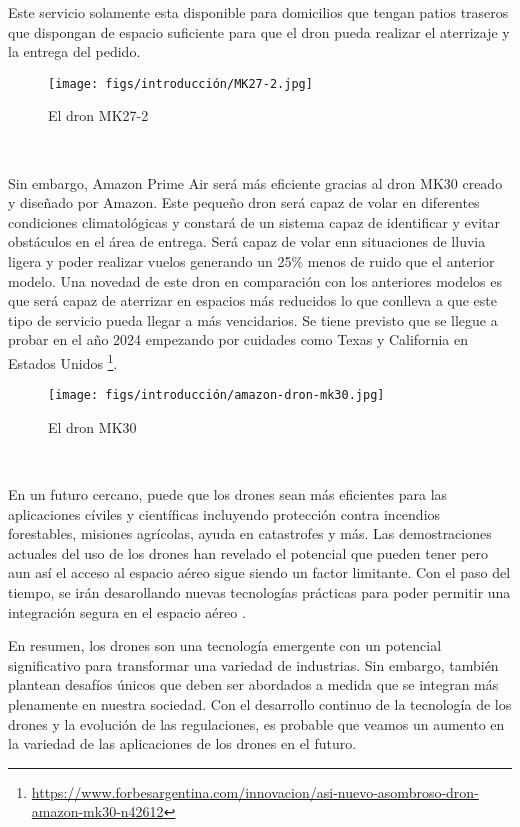 Este servicio solamente esta disponible para domicilios que tengan patios traseros que dispongan de espacio suficiente para que el dron pueda realizar el aterrizaje y la 
entrega del pedido.

\begin{figure} [H]
  \begin{center}
    \texttt{[image: figs/introducción/MK27-2.jpg]}
  \end{center}
  \caption{El dron MK27-2}
  \label{fig:MK27-2}
\end{figure}\

Sin embargo, Amazon Prime Air será más eficiente gracias al dron MK30 creado y diseñado por Amazon. Este pequeño dron será capaz de volar en diferentes condiciones climatológicas y 
constará de un sistema capaz de identificar y evitar obstáculos en el área de entrega. Será capaz de volar enn situaciones de lluvia ligera y poder realizar vuelos generando un 25\%
menos de ruido que el anterior modelo. Una novedad de este dron en comparación con los anteriores modelos es que será capaz de aterrizar en espacios más reducidos lo que conlleva a que
este tipo de servicio pueda llegar a más vencidarios. \newline
Se tiene previsto que se llegue a probar en el año 2024 empezando por cuidades como Texas y California en Estados Unidos
\footnote{\url{https://www.forbesargentina.com/innovacion/asi-nuevo-asombroso-dron-amazon-mk30-n42612}}. \newline


\begin{figure} [H]
  \begin{center}
    \texttt{[image: figs/introducción/amazon-dron-mk30.jpg]}
  \end{center}
  \caption{El dron MK30}
  \label{fig:MK30}
\end{figure}\

En un futuro cercano, puede que los drones sean más eficientes para las aplicaciones cíviles y científicas incluyendo protección contra incendios forestables, misiones agrícolas, 
ayuda en catastrofes y más. 
Las demostraciones actuales del uso de los drones han revelado el potencial que pueden tener pero aun así el acceso al espacio aéreo sigue siendo un factor limitante. Con el paso del 
tiempo, se irán desarollando nuevas tecnologías prácticas para poder permitir una integración segura en el espacio aéreo \cite{KrejciGarzon_2014}. \newline

En resumen, los drones son una tecnología emergente con un potencial significativo para transformar una variedad de industrias. Sin embargo, también plantean desafíos
únicos que deben ser abordados a medida que se integran más plenamente en nuestra sociedad. Con el desarrollo continuo de la tecnología de los drones y la evolución de las
regulaciones, es probable que veamos un aumento en la variedad de las aplicaciones de los drones en el futuro. \newline


